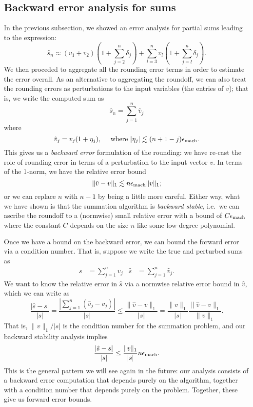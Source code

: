 \documentclass[12pt, leqno]{article} %
\begin{document}
\subsection{Backward error analysis for sums}

In the previous subsection, we showed an error analysis for partial sums
leading to the expression:
\[
  \hat{s}_n \approx (v_1 + v_2) \left(1 + \sum_{j=2}^n \delta_j \right)
              + \sum_{l=3}^n v_l \left( 1 + \sum_{j=l}^n \delta_j \right).
\]
We then proceded to aggregate all the rounding error terms in order to
estimate the error overall.  As an alternative to aggregating the roundoff,
we can also treat the rounding errors as perturbations to the input
variables (the entries of $v$); that is, we write the computed sum as
\[
  \hat{s}_n = \sum_{j=1}^n \hat{v}_j
\]
where
\[
  \hat{v}_j = v_j (1+\eta_j), \quad
  \mbox{ where }|\eta_j| \lesssim (n+1-j) \epsilon_{\mathrm{mach}}.
\]
This gives us a {\em backward error} formulation of the rounding:
we have re-cast the role of rounding error in terms of a
perturbation to the input vector $v$.  In terms of the 1-norm,
we have the relative error bound
\[
  \|\hat{v}-v\|_1 \lesssim n \epsilon_{\mathrm{mach}} \|v\|_1;
\]
or we can replace $n$ with $n-1$ by being a little more careful.
Either way, what we have shown is that the summation algorithm
is {\em backward stable}, i.e.~we can ascribe the roundoff to
a (normwise) small relative error with a bound of $C \epsilon_{\mathrm{mach}}$
where the constant $C$ depends on the size $n$ like some low-degree
polynomial.

Once we have a bound on the backward error, we can bound the forward
error via a condition number.  That is, suppose we write the true
and perturbed sums as
\begin{align*}
  s &= \sum_{j=1}^n v_j &
  \hat{s} &= \sum_{j=1}^n \hat{v}_j.
\end{align*}
We want to know the relative error in $\hat{s}$ via a normwise
relative error bound in $\hat{v}$, which we can write as
\[
  \frac{|\hat{s}-s|}{|s|} =
  \frac{|\sum_{j=1}^n (\hat{v}_j-v_j)|}{|s|} \leq
  \frac{\|\hat{v}-v\|_1}{|s|} =
  \frac{\|v\|_1}{|s|} \frac{\|\hat{v}-v\|_1}{\|v\|_1}.
\]
That is, $\|v\|_1/|s|$ is the condition number for the summation
problem, and our backward stability analysis implies
\[
  \frac{|\hat{s}-s|}{|s|} \leq
  \frac{\|v\|_1}{|s|} n \epsilon_{\mathrm{mach}}.
\]
This is the general pattern we will see again in the future:
our analysis consists of a backward error computation that depends
purely on the algorithm, together with a condition number that depends
purely on the problem.  Together, these give us forward error bounds.
\end{document}
